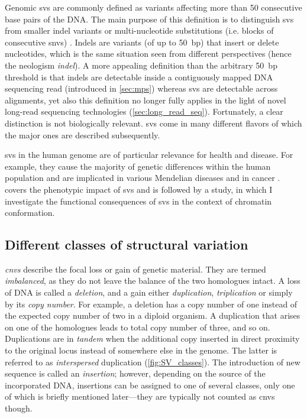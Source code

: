 Genomic \acfp{sv} are commonly defined as variants affecting more than
50 consecutive base pairs of the DNA. The main purpose of this definition is to
distinguish \acp{sv} from smaller indel variants or multi-nucleotide substitutions
(i.e. blocks of consecutive \acp{snv}) \citep{Alkan2011}. Indels are variants
(of up to 50~bp) that insert or delete nucleotides, which is the same situation
seen from different perspectives (hence the neologism \textit{indel}).
A more appealing definition than the arbitrary 50~bp threshold is that indels
are detectable inside a contiguously mapped DNA sequencing read (introduced in
\cref{sec:mps}) whereas \acp{sv} are detectable across alignments, yet also
this definition no longer fully applies in the light of novel long-read
sequencing technologies (\cref{sec:long_read_seq}). Fortunately, a clear
distinction is not biologically relevant. \Acp{sv} come in many different
flavors of which the major ones are described subsequently.

\Acp{sv} in the human genome are of particular relevance for health and disease.
For example, they cause the majority of genetic differences within the human
population and are implicated in various Mendelian diseases and in cancer \citep{Weischenfeldt2013}.
 covers the phenotypic impact of \acp{sv} and
is followed by a study, in which I investigate the functional consequences of
\acp{sv} in the context of chromatin conformation.




\subsection{Different classes of structural variation}
\label{sec:sv_classes}

\emph{\Acfp{cnv}} describe the focal loss or gain of genetic material. They are
termed \emph{imbalanced}, as they do not leave the balance of the two homologues
intact. A loss of DNA is called a \emph{deletion}, and a gain either
\emph{duplication}, \emph{triplication} or simply by its \emph{copy number}.
For example, a deletion has a copy number of one instead of the expected copy
number of two in a diploid organism. A duplication that arises on one of the
homologues leads to total copy number of three, and so on.
Duplications are in \emph{tandem} when the additional copy inserted in direct
proximity to the original locus instead of somewhere else in the genome. The
latter is referred to as \emph{interspersed} duplication (\cref{fig:SV_classes}).
The introduction of new sequence is called an \emph{insertion}; however,
depending on the source of the incorporated DNA, insertions can be assigned to
one of several classes, only one of which is briefly mentioned later---they are
typically not counted as \acp{cnv} though.

